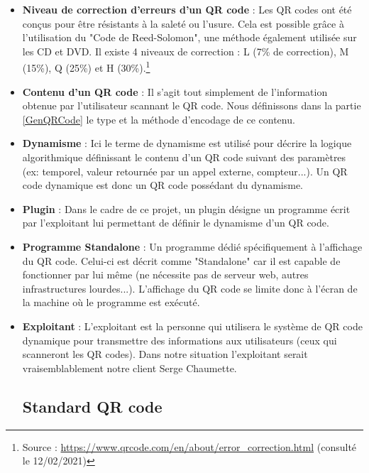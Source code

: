 \documentclass[a4paper,12pt]{article}
\begin{document}
\begin{itemize}
    \item \textbf{Niveau de correction d'erreurs d'un QR code} : Les QR codes ont été conçus pour être résistants à la saleté ou l'usure. Cela est possible grâce à l'utilisation du "Code de Reed-Solomon", une méthode également utilisée sur les CD et DVD. Il existe 4 niveaux de correction : L (7\% de correction), M (15\%), Q (25\%) et H (30\%).\footnote{Source : \url{https://www.qrcode.com/en/about/error_correction.html} (consulté le 12/02/2021)}\\
    
    \item \textbf{Contenu d'un QR code} : Il s'agit tout simplement de l'information obtenue par l'utilisateur scannant le QR code. Nous définissons dans la partie \ref{GenQRCode} le type et la méthode d'encodage de ce contenu.\\
    
    \item \textbf{Dynamisme} : Ici le terme de dynamisme est utilisé pour décrire la logique algorithmique définissant le contenu d'un QR code suivant des paramètres (ex: temporel, valeur retournée par un appel externe, compteur...). Un QR code dynamique est donc un QR code possédant du dynamisme.\\
    
    \item \textbf{Plugin} : Dans le cadre de ce projet, un plugin désigne un programme écrit par l'exploitant lui permettant de définir le dynamisme d'un QR code.\\
    
    \item \textbf{Programme Standalone} : Un programme dédié spécifiquement à l'affichage du QR code. Celui-ci est décrit comme "Standalone" car il est capable de fonctionner par lui même (ne nécessite pas de serveur web, autres infrastructures lourdes...). L'affichage du QR code se limite donc à l'écran de la machine où le programme est exécuté.\\
    
    \item \textbf{Exploitant} : L'exploitant est la personne qui utilisera le système de QR code dynamique pour transmettre des informations aux utilisateurs (ceux qui scanneront les QR codes). Dans notre situation l'exploitant serait vraisemblablement notre client Serge Chaumette.\\
    
\subsection{Standard QR code}


\end{itemize}
\end{document}
